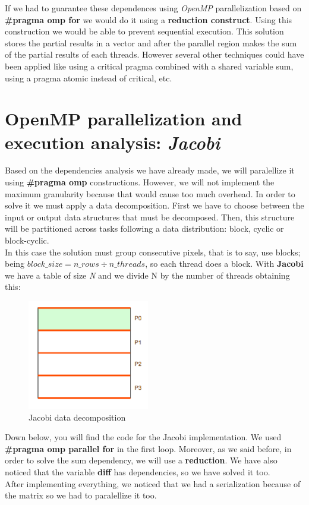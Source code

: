 \documentclass[12]{article}
\begin{document}
If we had to guarantee these dependences using \textit{OpenMP} parallelization based on \textbf{\#pragma omp for} we would do it using a \textbf{reduction construct}. Using this construction we would be able to prevent sequential execution. This solution stores the partial results in a vector and after the parallel region makes the sum of the partial results of each threads. However several other techniques could have been applied like using a critical pragma combined with a shared variable sum, using a pragma atomic instead of critical, etc. 


\section{OpenMP parallelization and execution analysis: \textit{Jacobi}}

Based on the dependencies analysis we have already made, we will paralellize it using \textbf{\#pragma omp} constructions. However, we will not implement the maximum granularity because that would cause too much overhead. In order to solve it we must apply a data decomposition. First we have to choose between the input or output data structures that must be decomposed. Then, this structure will be partitioned across tasks following a data distribution: block, cyclic or block-cyclic.
\\

In this case the solution must group consecutive pixels, that is to say, use blocks; being $block\_size = n\_rows \div n\_threads$, so each thread does a block. With \textbf{Jacobi} we have a table of size \textit{N} and we divide N by the number of threads obtaining this:

\begin{figure}[H]
    \centering
    \includegraphics[scale=0.55]{images/geometric_jacobi.png}
    \caption{Jacobi data decomposition}
\end{figure}

Down below, you will find the code for the Jacobi implementation. We used \textbf{\#pragma omp parallel for} in the first loop. Moreover, as we said before, in order to solve the sum dependency, we will use a \textbf{reduction}. We have also noticed that the variable \textbf{diff} has dependencies, so we have solved it too.
\\
After implementing everything, we noticed that we had a serialization because of the matrix so we had to paralellize it too. 
\medskip
\end{document}
